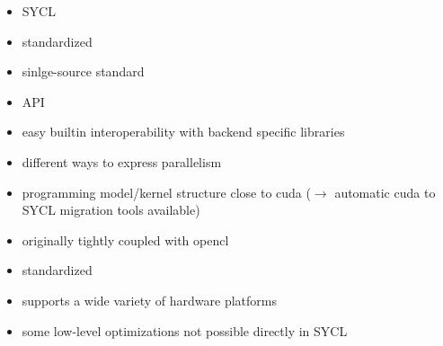 \begin{itemize}
    \item SYCL
    \item standardized
    \item sinlge-source standard \cpp
    \item \cpp API
    \item easy builtin interoperability with backend specific libraries
    \item different ways to express parallelism
    \item programming model/kernel structure close to \gls{cuda} ($\rightarrow$ automatic \gls{cuda} to SYCL migration tools available)
    \item originally tightly coupled with \gls{opencl}
\end{itemize}


\begin{advantagebox}
    \begin{itemize}
        \item standardized
        \item supports a wide variety of hardware platforms
    \end{itemize}
\end{advantagebox}

\begin{disadvantagebox}
    \begin{itemize}
        \item some low-level optimizations not possible directly in SYCL
    \end{itemize}
\end{disadvantagebox}

